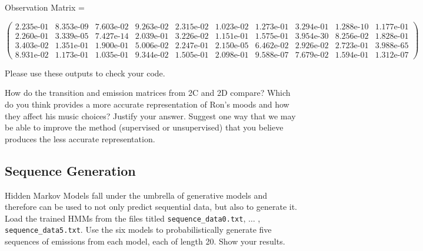 Observation Matrix =

\small
$\begin{pmatrix}
    2.235\text{e-}01 & 8.353\text{e-}09 & 7.603\text{e-}02 & 9.263\text{e-}02 & 2.315\text{e-}02 & 1.023\text{e-}02 & 1.273\text{e-}01 & 3.294\text{e-}01 & 1.288\text{e-}10 & 1.177\text{e-}01\\ 
    2.260\text{e-}01 & 3.339\text{e-}05 & 7.427\text{e-}14 & 2.039\text{e-}01 & 3.226\text{e-}02 & 1.151\text{e-}01 & 1.575\text{e-}01 & 3.954\text{e-}30 & 8.256\text{e-}02 & 1.828\text{e-}01\\  
    3.403\text{e-}02 & 1.351\text{e-}01 & 1.900\text{e-}01 & 5.006\text{e-}02 & 2.247\text{e-}01 & 2.150\text{e-}05 & 6.462\text{e-}02 & 2.926\text{e-}02 & 2.723\text{e-}01 & 3.988\text{e-}65\\   
    8.931\text{e-}02 & 1.173\text{e-}01 & 1.035\text{e-}01 & 9.344\text{e-}02 & 1.505\text{e-}01 & 2.098\text{e-}01 & 9.588\text{e-}07 & 7.679\text{e-}02 & 1.594\text{e-}01 & 1.312\text{e-}07   
\end{pmatrix}$
\normalsize
\medskip

Please use these outputs to check your code.

\begin{solution}
\end{solution}

\problem[5] How do the transition and emission matrices from 2C and 2D compare? Which do you think provides a more accurate representation of Ron's moods and how they affect his music choices? Justify your answer. Suggest one way that we may be able to improve the method (supervised or unsupervised) that you believe produces the less accurate representation. 

\begin{solution}
\end{solution}

\subsection{Sequence Generation}
Hidden Markov Models fall under the umbrella of generative models and therefore can be used to not only predict sequential data, but also to generate it. 
\problem[5] Load the trained HMMs from the files titled \texttt{sequence_data0.txt}, $\ldots$ , \texttt{sequence_data5.txt}. Use the six models to probabilistically generate five sequences of emissions from each model, each of length 20. Show your results. 

\begin{solution}
\end{solution}

